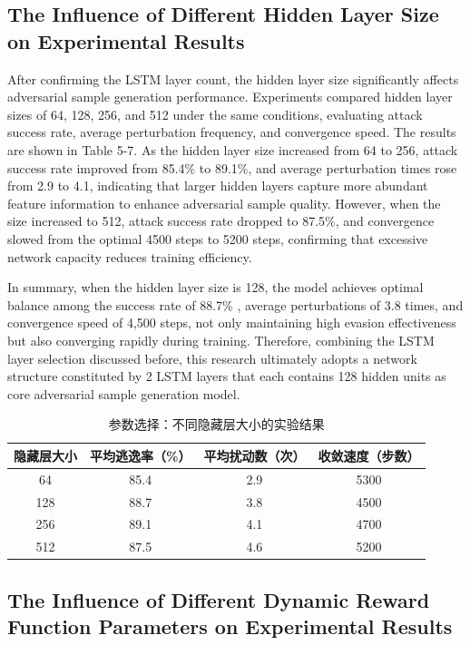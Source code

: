\subsection{The Influence of Different Hidden Layer Size on Experimental Results}

After confirming the LSTM layer count, the hidden layer size significantly affects adversarial sample generation performance. Experiments compared hidden layer sizes of 64, 128, 256, and 512 under the same conditions, evaluating attack success rate, average perturbation frequency, and convergence speed. The results are shown in Table 5-7. As the hidden layer size increased from 64 to 256, attack success rate improved from 85.4\% to 89.1\%, and average perturbation times rose from 2.9 to 4.1, indicating that larger hidden layers capture more abundant feature information to enhance adversarial sample quality. However, when the size increased to 512, attack success rate dropped to 87.5\%, and convergence slowed from the optimal 4500 steps to 5200 steps, confirming that excessive network capacity reduces training efficiency.

In summary, when the hidden layer size is 128, the model achieves optimal balance among the success rate of 88.7\% , average perturbations of 3.8 times, and convergence speed of 4,500 steps, not only maintaining high evasion effectiveness but also converging rapidly during training. Therefore, combining the LSTM layer selection discussed before, this research ultimately adopts a network structure constituted by 2 LSTM layers that each contains 128 hidden units as core adversarial sample generation model.

\begin{table}[htbp]
	\centering
	\caption{参数选择：不同隐藏层大小的实验结果}
	\label{tab:5.7}
	\begin{tabular*}{0.9\textwidth}{@{\extracolsep{\fill}}cccc}
		\toprule
		隐藏层大小 & 平均逃逸率（\%） & 平均扰动数（次） & 收敛速度（步数） \\
		\midrule
		64  & 85.4 & 2.9 & 5300 \\
		128 & 88.7 & 3.8 & 4500 \\
		256 & 89.1 & 4.1 & 4700 \\
		512 & 87.5 & 4.6 & 5200 \\
		\bottomrule
	\end{tabular*}
\end{table}

\subsection{The Influence of Different Dynamic Reward Function Parameters on Experimental Results}

